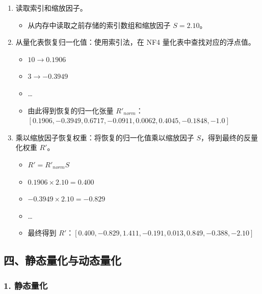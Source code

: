 \begin{enumerate}
\def\labelenumi{\arabic{enumi}.}
\item
  读取索引和缩放因子。

  \begin{itemize}
  \tightlist
  \item
    从内存中读取之前存储的索引数组和缩放因子 \(S = 2.10\)。
  \end{itemize}
\item
  从量化表恢复归一化值：使用索引法，在 NF4 量化表中查找对应的浮点值。

  \begin{itemize}
  \tightlist
  \item
    \(10 \to 0.1906\)
  \item
    \(3 \to -0.3949\)
  \item
    \ldots{}
  \item
    由此得到恢复的归一化张量 \(R'_{norm}\)：\([0.1906, -0.3949, 0.6717, -0.0911, 0.0062, 0.4045, -0.1848, -1.0]\)
  \end{itemize}
\item
  乘以缩放因子恢复权重：将恢复的归一化值乘以缩放因子 \(S\)，得到最终的反量化权重 \(R'\)。

  \begin{itemize}
  \tightlist
  \item
    \(R' = R'_{norm}S\)
  \item
    \(0.1906 \times 2.10 = 0.400\)
  \item
    \(-0.3949 \times 2.10 = -0.829\)
  \item
    \ldots{}
  \item
    最终得到 \(R'\)：\([0.400, -0.829, 1.411, -0.191, 0.013, 0.849, -0.388, -2.10]\)
  \end{itemize}
\end{enumerate}

\hypertarget{ux56dbux9759ux6001ux91cfux5316ux4e0eux52a8ux6001ux91cfux5316}{%
\subsection{四、静态量化与动态量化}\label{ux56dbux9759ux6001ux91cfux5316ux4e0eux52a8ux6001ux91cfux5316}}

\hypertarget{ux9759ux6001ux91cfux5316}{%
\subsubsection{1. 静态量化}\label{ux9759ux6001ux91cfux5316}}

